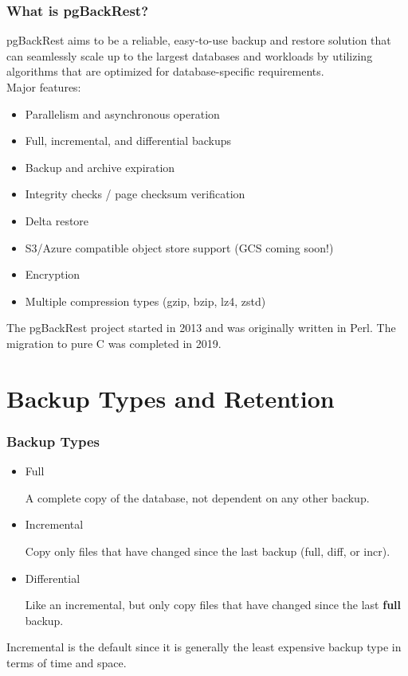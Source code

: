 \begin{frame}
    \frametitle{What is pgBackRest?}

    pgBackRest aims to be a reliable, easy-to-use backup and restore solution that can seamlessly scale up to the largest databases and workloads by utilizing algorithms that are optimized for database-specific requirements.
    \\\vspace{1em}
    Major features:

    \begin{itemize}
        \item Parallelism and asynchronous operation
        \item Full, incremental, and differential backups
        \item Backup and archive expiration
        \item Integrity checks / page checksum verification
        \item Delta restore
        \item S3/Azure compatible object store support (GCS coming soon!)
        \item Encryption
        \item Multiple compression types (gzip, bzip, lz4, zstd)
    \end{itemize}

    The pgBackRest project started in 2013 and was originally written in Perl. The migration to pure C was completed in 2019.
\end{frame}

\section{Backup Types and Retention}

\begin{frame}
    \frametitle{Backup Types}

    \begin{itemize}
        \item Full

        A complete copy of the database, not dependent on any other backup.

        \item Incremental

        Copy only files that have changed since the last backup (full, diff, or incr).

        \item Differential

        Like an incremental, but only copy files that have changed since the last \textbf{full} backup.
    \end{itemize}

    Incremental is the default since it is generally the least expensive backup type in terms of time and space.
\end{frame}

